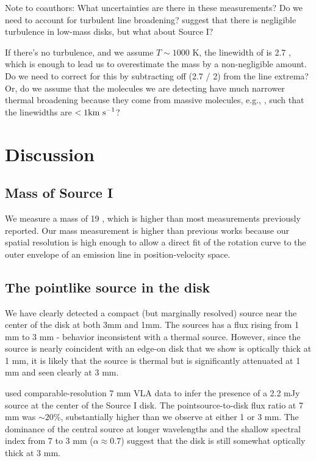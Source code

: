 \documentclass[twocolumn]{aastex61}
\begin{document}
{\color{red} Note to coauthors:
What uncertainties are there in these measurements?
Do we need to account for turbulent line broadening?
\citet{Flaherty2017a} suggest that there is negligible turbulence in low-mass disks,
but what about Source I?

If there's no turbulence, and we assume $T\sim1000$ K, the
linewidth of \hh is 2.7 \kms, which is enough to lead us to overestimate the mass by a
non-negligible amount.  Do we need to correct for this by subtracting off (2.7 / 2) \kms
from the line extrema?  Or, do we assume that the molecules we are detecting have
much narrower thermal broadening because they come from massive molecules, e.g., \methanol,
such that the linewidths are $<1 \textrm{km~s}^{-1}$?
}


\section{Discussion}
\subsection{Mass of Source I}
We measure a mass of 19 \msun, which is higher than most measurements previously
reported.  Our mass measurement is higher than previous works because
our spatial resolution is high enough to allow a direct fit of the rotation
curve to the outer envelope of an emission line in position-velocity space.


\subsection{The pointlike source in the disk}
\label{sec:ptsrc}
We have clearly detected a compact (but marginally resolved) source near the
center of the disk at both 3mm and 1mm.  The sources has a flux rising from 1
mm to 3 mm - behavior inconsistent with a thermal source.  However, since the
source is nearly coincident with an edge-on disk that we show is optically
thick at 1 mm, it is likely that the source is thermal but is significantly
attenuated at 1 mm and seen clearly at 3 mm.

\citet{Reid2007a} used comparable-resolution 7 mm VLA data to infer
the presence of a 2.2 mJy source at the center of the Source I disk.
The pointsource-to-disk flux ratio at 7 mm was $\sim20\%$, substantially
higher than we observe at either 1 or 3 mm.  The dominance of the central
source at longer wavelengths and the shallow spectral index from 7 to 3 mm
($\alpha\approx0.7$) suggest that the disk is still somewhat optically
thick at 3 mm.
\end{document}
